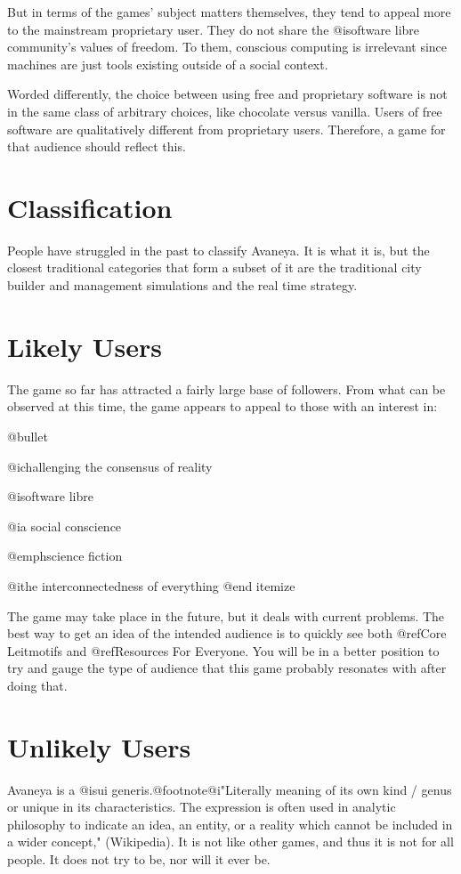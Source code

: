 But in terms of the games' subject matters themselves, they tend to appeal more to the mainstream proprietary user. They do not share the @i{software libre} community's values of freedom. To them, conscious computing is irrelevant since machines are just tools existing outside of a social context. 

Worded differently, the choice between using free and proprietary software is not in the same class of arbitrary choices, like chocolate versus vanilla. Users of free software are qualitatively different from proprietary users. Therefore, a game for that audience should reflect this.

\section{Classification}
People have struggled in the past to classify Avaneya. It is what it is, but the closest traditional categories that form a subset of it are the traditional city builder and management simulations and the real time strategy.

\section{Likely Users}
The game so far has attracted a fairly large base of followers. From what can be observed at this time, the game appears to appeal to those with an interest in:

\itemize @bullet
\item
@i{challenging the consensus of reality}
\item
@i{software libre}
\item
@i{a social conscience}
\item
@emph{science fiction}
\item
@i{the interconnectedness of everything}
@end itemize

The game may take place in the future, but it deals with current problems. The best way to get an idea of the intended audience is to quickly see both @ref{Core Leitmotifs} and @ref{Resources For Everyone}. You will be in a better position to try and gauge the type of audience that this game probably resonates with after doing that. 

\section{Unlikely Users}
Avaneya is a @i{sui generis}.@footnote{@i{"Literally meaning of its own kind / genus or unique in its characteristics. The expression is often used in analytic philosophy to indicate an idea, an entity, or a reality which cannot be included in a wider concept,"} (Wikipedia).} It is not like other games, and thus it is not for all people. It does not try to be, nor will it ever be.

